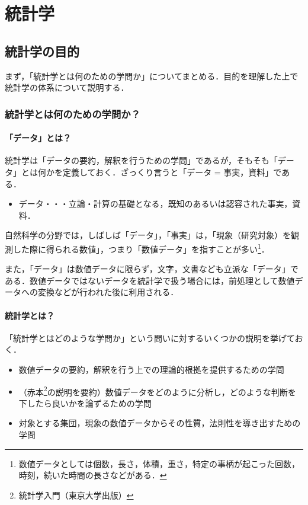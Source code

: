 \part{統計学}

\chapter{統計学の目的}

まず，「統計学とは何のための学問か」についてまとめる．目的を理解した上で統計学の体系について説明する．

\section{統計学とは何のための学問か？}

\subsection{「データ」とは？}

統計学は「データの要約，解釈を行うための学問」であるが，そもそも「データ」とは何かを定義しておく．ざっくり言うと「データ = 事実，資料」である．

\begin{itemize}
  \item データ・・・立論・計算の基礎となる，既知のあるいは認容された事実，資料．
\end{itemize}

自然科学の分野では，しばしば「データ」，「事実」は，「現象（研究対象）を観測した際に得られる数値」，つまり「数値データ」を指すことが多い\footnote{数値データとしては個数，長さ，体積，重さ，特定の事柄が起こった回数，時刻，続いた時間の長さなどがある．}．

また，「データ」は数値データに限らず，文字，文書なども立派な「データ」である．数値データではないデータを統計学で扱う場合には，前処理として数値データへの変換などが行われた後に利用される．

\subsection{統計学とは？}

「統計学とはどのような学問か」という問いに対するいくつかの説明を挙げておく．

\begin{itemize}
  \item 数値データの要約，解釈を行う上での理論的根拠を提供するための学問
  \item （赤本\footnote{統計学入門（東京大学出版）}の説明を要約）数値データをどのように分析し，どのような判断を下したら良いかを論ずるための学問
  \item 対象とする集団，現象の数値データからその性質，法則性を導き出すための学問
\end{itemize}

